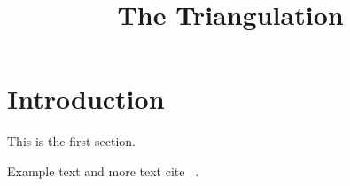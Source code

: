 \documentclass[a4paper]{article}
\begin{document}
	\sloppy
	\title{The Triangulation}
	
	\begin{titlepage}
		\maketitle
		\thispagestyle{empty}
	\end{titlepage}


	\tableofcontents
	\newpage
	\section{Introduction}
   
	This is the first section.
	
	Example text  and more text
	cite ~\autocite{malhotra2010critical}.

	
	
	\newpage
	\printglossary[type=\acronymtype]
	\printglossary
	
	\newpage
	\printbibliography[heading=bibintoc]
	
	\newpage
	\listoftodos[Notes]
\end{document}
